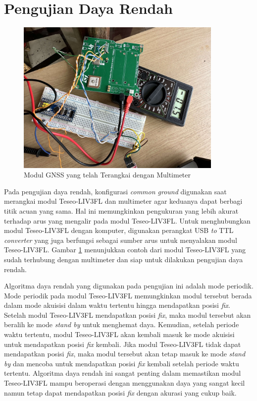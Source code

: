 \section{Pengujian Daya Rendah}
\begin{figure}[H]
	\centering
	\includegraphics[width=10cm]{contents/chapter-4/low-power.jpg}
	\caption{Modul GNSS yang telah Terangkai dengan Multimeter}
	\label{Fig: low-power-connected}
\end{figure}

Pada pengujian daya rendah, konfigurasi \textit{common ground} digunakan saat merangkai modul Teseo-LIV3FL dan multimeter agar keduanya dapat berbagi titik acuan yang sama. Hal ini memungkinkan pengukuran yang lebih akurat terhadap arus yang mengalir pada modul Teseo-LIV3FL. Untuk menghubungkan modul Teseo-LIV3FL dengan komputer, digunakan perangkat USB \textit{to} TTL \textit{converter} yang juga berfungsi sebagai sumber arus untuk menyalakan modul Teseo-LIV3FL. Gambar \ref{Fig: low-power-connected} menunjukkan contoh dari modul Teseo-LIV3FL yang sudah terhubung dengan multimeter dan siap untuk dilakukan pengujian daya rendah.

Algoritma daya rendah yang digunakan pada pengujian ini adalah mode periodik. Mode periodik pada modul Teseo-LIV3FL memungkinkan modul tersebut berada dalam mode akuisisi dalam waktu tertentu hingga mendapatkan posisi \textit{fix}. Setelah modul Teseo-LIV3FL mendapatkan posisi \textit{fix}, maka modul tersebut akan beralih ke mode \textit{stand by} untuk menghemat daya. Kemudian, setelah periode waktu tertentu, modul Teseo-LIV3FL akan kembali masuk ke mode akuisisi untuk mendapatkan posisi \textit{fix} kembali. Jika modul Teseo-LIV3FL tidak dapat mendapatkan posisi \textit{fix}, maka modul tersebut akan tetap masuk ke mode \textit{stand by} dan mencoba untuk mendapatkan posisi \textit{fix} kembali setelah periode waktu tertentu. Algoritma daya rendah ini sangat penting dalam memastikan modul Teseo-LIV3FL mampu beroperasi dengan menggunakan daya yang sangat kecil namun tetap dapat mendapatkan posisi \textit{fix} dengan akurasi yang cukup baik.

